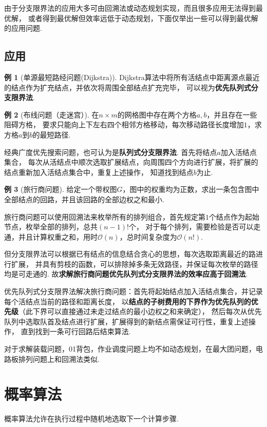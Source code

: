 \documentclass[12pt, a4paper, oneside]{ctexart}
\numberwithin{equation}{section}  %
\theoremstyle{definition}
\newtheorem{example}{例}[section]
\def\O{\mathcal{O}}         %
\begin{document}
由于分支限界法的应用大多可由回溯法或动态规划实现，而且很多应用无法得到最优解，
或者得到最优解但效率远低于动态规划，下面仅举出一些可以得到最优解的应用问题.

\subsection{应用}
\begin{example}[单源最短路经问题(Dijkstra)]
Dijkstra算法中将所有活结点中距离源点最近的结点作为扩充结点，并依次将周围全部结点扩充完毕，
可以视为\textbf{优先队列式分支限界法}.
\end{example}
\begin{example}[布线问题（走迷宫）]
在$n\times m$的网格图中存在两个方格$a,b$，并且存在一些阻碍方格，
要求只能向上下左右四个相邻方格移动，每次移动路径长度增加$1$，求方格$a$到$b$的最短路径.

经典广度优先搜索问题，也可认为是\textbf{队列式分支限界法}. 首先将结点$a$加入活结点集合，
每次从活结点中顺次选取扩展结点，向周围四个方向进行扩展，将扩展的结点重新加入活结点集合中，重复上述操作，
知道找到结点$b$为止.
\end{example}
\begin{example}[旅行商问题]
给定一个带权图$G$，图中的权重均为正数，求出一条包含图中全部结点的回路，并且该回路的全部边权之和最小.

旅行商问题可以使用回溯法来枚举所有的排列组合，首先规定第$1$个结点作为起始节点，枚举全部的排列，总共$(n-1)!$个，
对于每个排列，需要检验是否可以走通，并且计算权重之和，用时$\O(n)$，总时间复杂度为$\O(n!)$.

但分支限界法可以根据已有结点的信息结合贪心的思想，每次选取距离最近的路进行扩展，
并具有剪枝的函数，可以排除掉多条无效路径，并保证每次枚举的路径均是可走通的. 
故\textbf{求解旅行商问题优先队列式分支限界法的效率应高于回溯法}.

优先队列式分支限界法解决旅行商问题：首先将起始结点加入活结点集合，并记录每个活结点当前的路径和距离长度，
以\textbf{结点的子树费用的下界作为优先队列的优先级}（此下界可以直接通过未走过结点的最小边权之和来确定），
然后每次从优先队列中选取队首及结点进行扩展，扩展得到的新结点需保证可行性，重复上述操作，
直到找到一条可行回路后结束算法.
\end{example}

对于求解装载问题，01背包，作业调度问题上均不如动态规划，在最大团问题，电路板排列问题上和回溯法类似.
\section{概率算法}
概率算法允许在执行过程中随机地选取下一个计算步骤.
\end{document}
